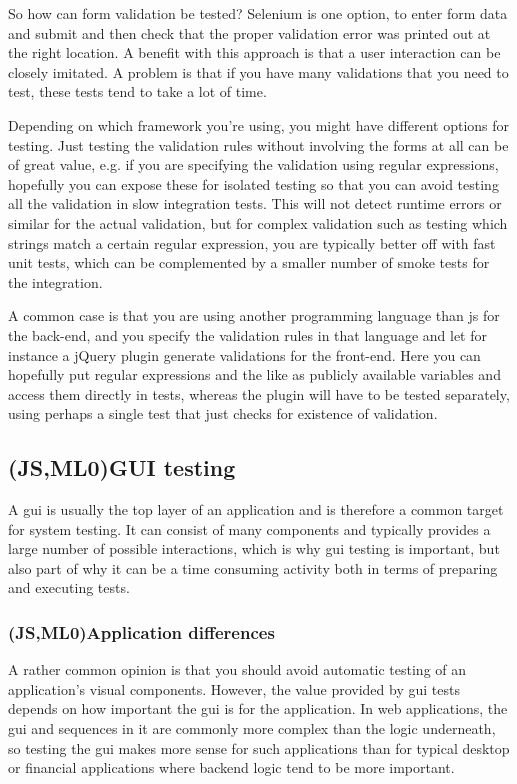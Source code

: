 \documentclass[11pt]{article}
\begin{document}
So how can form validation be tested? Selenium is one option, to enter form data and submit and then check that the proper validation error was printed out at the right location. A benefit with this approach is that a user interaction can be closely imitated. A problem is that if you have many validations that you need to test, these tests tend to take a lot of time.

Depending on which framework you're using, you might have different options for testing. Just testing the validation rules without involving the forms at all can be of great value, e.g. if you are specifying the validation using regular expressions, hopefully you can expose these for isolated testing so that you can avoid testing all the validation in slow integration tests. This will not detect runtime errors or similar for the actual validation, but for complex validation such as testing which strings match a certain regular expression, you are typically better off with fast unit tests, which can be complemented by a smaller number of smoke tests for the integration.

A common case is that you are using another programming language than \gls{js} for the back-end, and you specify the validation rules in that language and let for instance a jQuery plugin generate validations for the front-end. Here you can hopefully put regular expressions and the like as publicly available variables and access them directly in tests, whereas the plugin will have to be tested separately, using perhaps a single test that just checks for existence of validation.

\subsection{(JS,ML0)GUI testing}

A \acrfull{gui} is usually the top layer of an application and is therefore a common target for system testing. It can consist of many components and typically provides a large number of possible interactions, which is why \gls{gui} testing is important, but also part of why it can be a time consuming activity both in terms of preparing and executing tests.

\subsubsection{(JS,ML0)Application differences}

A rather common opinion is that you should avoid automatic testing of an application's visual components. However, the value provided by \gls{gui} tests depends on how important the \gls{gui} is for the application. In web applications, the \gls{gui} and sequences in it are commonly more complex than the logic underneath, so testing the \gls{gui} makes more sense for such applications than for typical desktop or financial applications where backend logic tend to be more important. \cite[question~21]{Ahnve}
\end{document}
